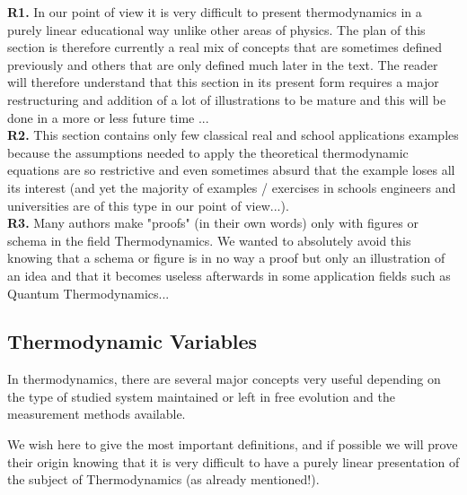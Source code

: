 	\pagebreak
	\begin{tcolorbox}[title=Remarks,colframe=black,arc=10pt]
	\textbf{R1.} In our point of view it is very difficult to present thermodynamics in a purely linear educational way unlike other areas of physics. The plan of this section is therefore currently a real mix of concepts that are sometimes defined previously and others that are only defined much later in the text. The reader will therefore understand that this section in its present form requires a major restructuring and addition of a lot of illustrations to be mature and this will be done in a more or less future time ...\\
	
	\textbf{R2.} This section contains only few classical real and school applications examples because the assumptions needed to apply the theoretical thermodynamic equations are so restrictive and even sometimes absurd that the example loses all its interest (and yet the majority of examples / exercises in schools engineers and universities are of this type in our point of view...).\\
	
	\textbf{R3.} Many authors make "proofs" (in their own words) only with figures or schema in the field Thermodynamics. We wanted to absolutely avoid this knowing that a schema or figure is in no way a proof but only an illustration of an idea and that it becomes useless afterwards in some application fields such as Quantum Thermodynamics...
	\end{tcolorbox}

	\subsection{Thermodynamic Variables}
	In thermodynamics, there are several major concepts very useful depending on the type of studied system maintained or left in free evolution and the measurement methods available.
	
	We wish here to give the most important definitions, and if possible we will prove their origin knowing that it is very difficult to have a purely linear presentation of  the subject of Thermodynamics (as already mentioned!).
	

